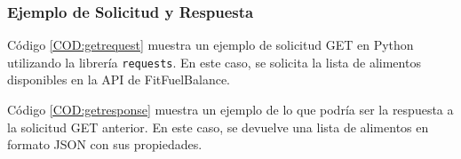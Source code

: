 \subsubsection{Ejemplo de Solicitud y Respuesta}
Código \ref{COD:getrequest} muestra un ejemplo de solicitud GET en Python utilizando la librería \texttt{requests}. En este caso, se solicita la lista de alimentos disponibles en la API de FitFuelBalance.

Código \ref{COD:getresponse} muestra un ejemplo de lo que podría ser la respuesta a la solicitud GET anterior. En este caso, se devuelve una lista de alimentos en formato JSON con sus propiedades.
